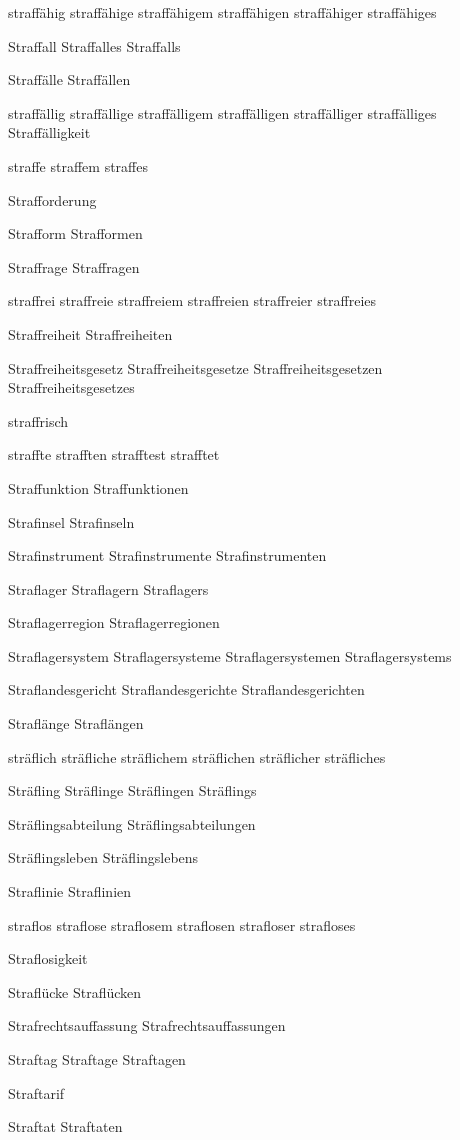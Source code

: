 straffähig
straffähige
straffähigem
straffähigen
straffähiger
straffähiges

Straffall
Straffalles
Straffalls

Straffälle
Straffällen

straffällig
straffällige
straffälligem
straffälligen
straffälliger
straffälliges
Straffälligkeit

straffe
straffem
straffes

Strafforderung

Strafform
Strafformen

Straffrage
Straffragen

straffrei
straffreie
straffreiem
straffreien
straffreier
straffreies

Straffreiheit
Straffreiheiten

Straffreiheitsgesetz
Straffreiheitsgesetze
Straffreiheitsgesetzen
Straffreiheitsgesetzes

straffrisch

straffte
strafften
strafftest
strafftet

Straffunktion
Straffunktionen

Strafinsel
Strafinseln

Strafinstrument
Strafinstrumente
Strafinstrumenten

Straflager
Straflagern
Straflagers

Straflagerregion
Straflagerregionen

Straflagersystem
Straflagersysteme
Straflagersystemen
Straflagersystems

Straflandesgericht
Straflandesgerichte
Straflandesgerichten

Straflänge
Straflängen

sträflich
sträfliche
sträflichem
sträflichen
sträflicher
sträfliches

Sträfling
Sträflinge
Sträflingen
Sträflings

Sträflingsabteilung
Sträflingsabteilungen

Sträflingsleben
Sträflingslebens

Straflinie
Straflinien

straflos
straflose
straflosem
straflosen
strafloser
strafloses

Straflosigkeit

Straflücke
Straflücken

Strafrechtsauffassung
Strafrechtsauffassungen

Straftag
Straftage
Straftagen

Straftarif

Straftat
Straftaten

